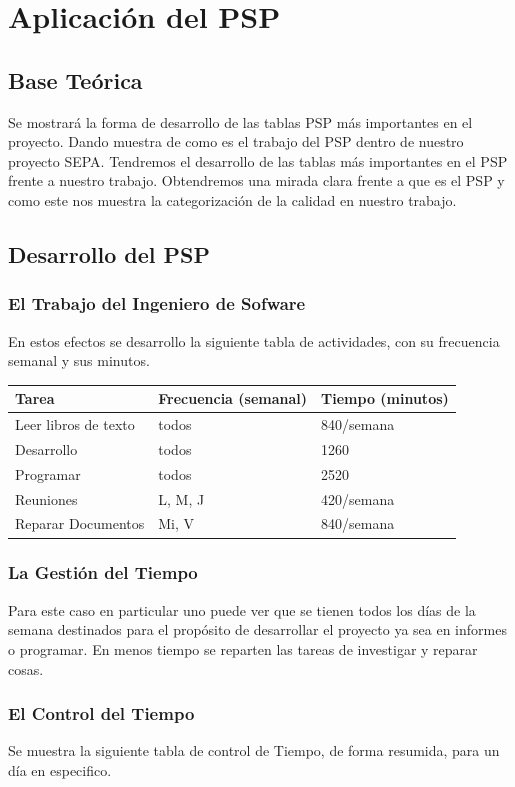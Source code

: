 \documentclass[a4paper,12pt,openany,oneside]{book}
\begin{document}
\chapter{Aplicación del PSP}
\thispagestyle{empty}
\section{Base Teórica}
Se mostrará la forma de desarrollo de las tablas PSP más importantes en el proyecto. Dando muestra de como es el trabajo del PSP dentro de nuestro proyecto SEPA. Tendremos el desarrollo de las tablas más importantes en el PSP frente a nuestro trabajo. Obtendremos una mirada clara frente a que es el PSP y como este nos muestra la categorización de la calidad en nuestro trabajo.
\section{Desarrollo del PSP}
\subsection{El Trabajo del Ingeniero de Sofware}
En estos efectos se desarrollo la siguiente tabla de actividades, con su frecuencia semanal y sus minutos.

\begin{tabular}{|l | l | l |}
\hline
\textbf{Tarea} & \textbf{Frecuencia (semanal)} & \textbf{Tiempo (minutos)} \\
\hline
Leer libros de texto & todos & 840/semana\\
\hline
Desarrollo & todos & 1260\\
\hline
Programar & todos & 2520\\
\hline
Reuniones & L, M, J & 420/semana\\
\hline
Reparar Documentos & Mi, V & 840/semana\\
\hline
\end{tabular}
\subsection{La Gestión del Tiempo}
Para este caso en particular uno puede ver que se tienen todos los días de la semana destinados para el propósito de desarrollar el proyecto ya sea en informes o programar. En menos tiempo se reparten las tareas de investigar y reparar cosas.
\subsection{El Control del Tiempo}
Se muestra la siguiente tabla de control de Tiempo, de forma resumida, para un día en especifico.
\end{document}
